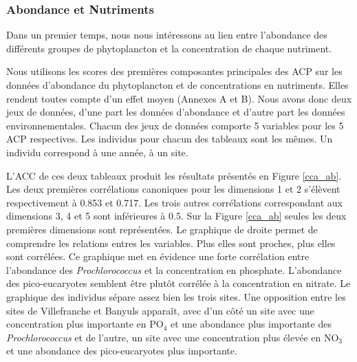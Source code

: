\documentclass[12pt]{article}
\begin{document}
\subsubsection{Abondance et Nutriments}

Dans un premier temps, nous nous intéressons au lien entre l'abondance des différents groupes de phytoplancton et la concentration de chaque nutriment.   

Nous utilisons les scores des premières composantes principales des ACP sur les données d’abondance du phytoplancton et de concentrations en nutriments. Elles rendent toutes compte d’un effet moyen (Annexes A et B). Nous avons donc deux jeux de données, d’une part les données d’abondance et d’autre part les données environnementales. Chacun des jeux de données comporte 5 variables pour les 5 ACP respectives. Les individus pour chacun des tableaux sont les mêmes. Un individu correspond à une année, à un site.

L’ACC de ces deux tableaux produit les résultats présentés en Figure \ref{cca_ab}. Les deux premières corrélations canoniques pour les dimensions 1 et 2 s’élèvent respectivement à 0.853 et 0.717.  Les trois autres corrélations correspondant aux dimensions 3, 4 et 5 sont inférieures à 0.5. Sur la Figure \ref{cca_ab} seules les deux premières dimensions sont représentées. Le graphique de droite permet de comprendre les relations entres les variables. Plus elles sont proches, plus elles sont corrélées. Ce graphique met en évidence une forte corrélation entre l’abondance des  \textit{Prochlorococcus} et la concentration en phosphate. L’abondance des pico-eucaryotes semblent être plutôt corrélée à la concentration en nitrate. Le graphique des individus sépare assez bien les trois sites. Une opposition entre les sites de Villefranche et Banyuls apparaît, avec d’un côté un site avec une concentration plus importante en PO$_4$ et une abondance plus importante des \textit{Prochlorococcus} et de l’autre, un site avec une concentration plus élevée en NO$_3$ et une abondance des pico-eucaryotes plus importante. 
\end{document}
